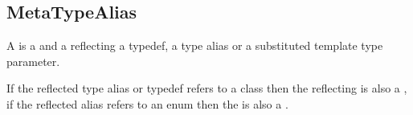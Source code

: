 \subsection{MetaTypeAlias}
\label{concept-MetaTypeAlias}

A  is a  and a 
reflecting a typedef, a type alias or a substituted template type parameter.



If the reflected type alias or typedef refers to a class then the reflecting
 is also a , if the reflected alias refers
to an enum then the  is also a .
